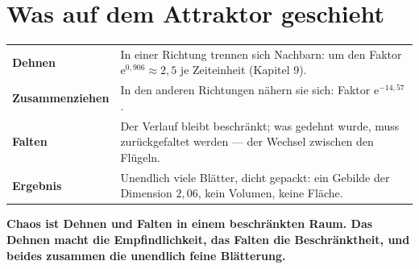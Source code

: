 \section{Was auf dem Attraktor geschieht}

\begin{merksatz}
\begin{center}
{\small
\renewcommand{\arraystretch}{1.5}
\begin{tabular}{@{}P{3.0cm}P{5.8cm}@{}}
\toprule
\textbf{Dehnen} & In einer Richtung trennen sich Nachbarn: um den Faktor $\mathrm e^{0{,}906}\approx 2{,}5$ je Zeiteinheit (Kapitel 9).\\
\textbf{Zusammenziehen} & In den anderen Richtungen nähern sie sich: Faktor $\mathrm e^{-14{,}57}$.\\
\textbf{Falten} & Der Verlauf bleibt beschränkt; was gedehnt wurde, muss zurückgefaltet werden --- der Wechsel zwischen den Flügeln.\\
\textbf{Ergebnis} & Unendlich viele Blätter, dicht gepackt: ein Gebilde der Dimension $2{,}06$, kein Volumen, keine Fläche.\\
\bottomrule
\end{tabular}}
\end{center}

\begin{center}
\begin{minipage}{0.9\textwidth}
\textbf{Chaos ist Dehnen und Falten in einem beschränkten Raum. Das Dehnen macht die Empfindlichkeit, das Falten die Beschränktheit, und beides zusammen die unendlich feine Blätterung.}
\end{minipage}
\end{center}

\begin{center}
\begin{minipage}{0.88\textwidth}
\end{minipage}
\end{center}
\end{merksatz}

